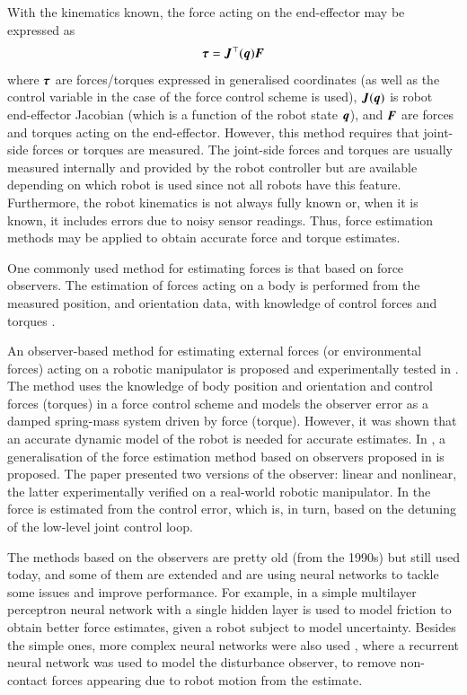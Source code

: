 With the kinematics known, the force acting on the end-effector may be expressed as 
\[
    {\bm{\tau}} = {\bm{J}}^\top({\bm{q}}){\bm{F}}
\]
where ${\bm{\tau}}$ are forces/torques expressed in generalised coordinates (as well as the control variable in the case of the force control scheme is used), ${\bm{J}}({\bm{q}})$ is robot end-effector Jacobian (which is a function of the robot state ${\bm{q}}$), and ${\bm{F}}$ are forces and torques acting on the end-effector. However, this method requires that joint-side forces or torques are measured. The joint-side forces and torques are usually measured internally and provided by the robot controller but are available depending on which robot is used since not all robots have this feature. Furthermore, the robot kinematics is not always fully known or, when it is known, it includes errors due to noisy sensor readings. Thus, force estimation methods may be applied to obtain accurate force and torque estimates. 

One commonly used method for estimating forces is that based on force observers. The estimation of forces acting on a body is performed from the measured position, and orientation data, with knowledge of control forces and torques \cite{Hacksel1994,Ohishi1991,Eom1998,Alcocer2003,Stolt2012}.

An observer-based method for estimating external forces (or environmental forces) acting on a robotic manipulator is proposed and experimentally tested in \cite{Hacksel1994}. The method uses the knowledge of body position and orientation and control forces (torques) in a force control scheme and models the observer error as a damped spring-mass system driven by force (torque). However, it was shown that an accurate dynamic model of the robot is needed for accurate estimates. In \cite{Alcocer2003}, a generalisation of the force estimation method based on observers proposed in \cite{Hacksel1994} is proposed. The paper presented two versions of the observer: linear and nonlinear, the latter experimentally verified on a real-world robotic manipulator. In \cite{Stolt2012} the force is estimated from the control error, which is, in turn, based on the detuning of the low-level joint control loop.

The methods based on the observers are pretty old (from the 1990s) but still used today, and some of them are extended and are using neural networks to tackle some issues and improve performance. For example, in \cite{Liu2021} a simple multilayer perceptron neural network with a single hidden layer is used to model friction to obtain better force estimates, given a robot subject to model uncertainty. Besides the simple ones, more complex neural networks were also used \cite{Dine2020}, where a recurrent neural network was used to model the disturbance observer, to remove non-contact forces appearing due to robot motion from the estimate.

